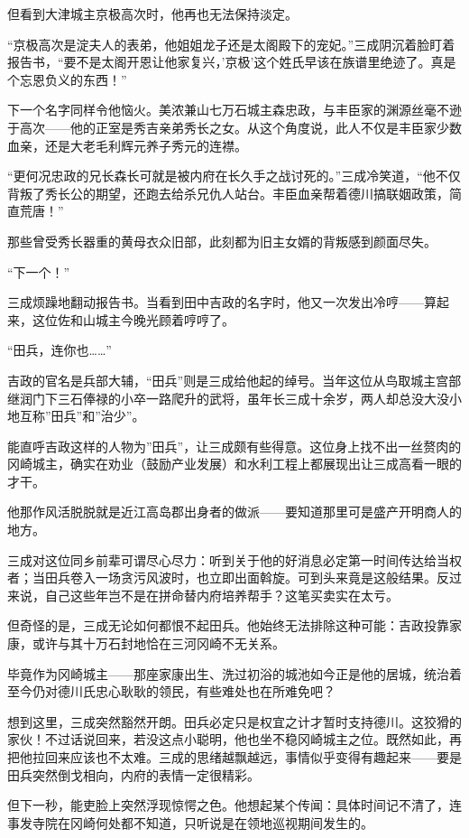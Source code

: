 \documentclass[
]{book}
\begin{document}
但看到大津城主京极高次时，他再也无法保持淡定。

``京极高次是淀夫人的表弟，他姐姐龙子还是太阁殿下的宠妃。''三成阴沉着脸盯着报告书，``要不是太阁开恩让他家复兴，'京极'这个姓氏早该在族谱里绝迹了。真是个忘恩负义的东西！''

下一个名字同样令他恼火。美浓兼山七万石城主森忠政，与丰臣家的渊源丝毫不逊于高次------他的正室是秀吉亲弟秀长之女。从这个角度说，此人不仅是丰臣家少数血亲，还是大老毛利辉元养子秀元的连襟。

``更何况忠政的兄长森长可就是被内府在长久手之战讨死的。''三成冷笑道，``他不仅背叛了秀长公的期望，还跑去给杀兄仇人站台。丰臣血亲帮着德川搞联姻政策，简直荒唐！''

那些曾受秀长器重的黄母衣众旧部，此刻都为旧主女婿的背叛感到颜面尽失。

``下一个！''

三成烦躁地翻动报告书。当看到田中吉政的名字时，他又一次发出冷哼------算起来，这位佐和山城主今晚光顾着哼哼了。

``田兵，连你也\ldots\ldots{}''

吉政的官名是兵部大辅，``田兵''则是三成给他起的绰号。当年这位从鸟取城主宫部继润门下三石俸禄的小卒一路爬升的武将，虽年长三成十余岁，两人却总没大没小地互称''田兵''和''治少''。

能直呼吉政这样的人物为''田兵''，让三成颇有些得意。这位身上找不出一丝赘肉的冈崎城主，确实在劝业（鼓励产业发展）和水利工程上都展现出让三成高看一眼的才干。

他那作风活脱脱就是近江高岛郡出身者的做派------要知道那里可是盛产开明商人的地方。

三成对这位同乡前辈可谓尽心尽力：听到关于他的好消息必定第一时间传达给当权者；当田兵卷入一场贪污风波时，也立即出面斡旋。可到头来竟是这般结果。反过来说，自己这些年岂不是在拼命替内府培养帮手？这笔买卖实在太亏。

但奇怪的是，三成无论如何都恨不起田兵。他始终无法排除这种可能：吉政投靠家康，或许与其十万石封地恰在三河冈崎不无关系。

毕竟作为冈崎城主------那座家康出生、洗过初浴的城池如今正是他的居城，统治着至今仍对德川氏忠心耿耿的领民，有些难处也在所难免吧？

想到这里，三成突然豁然开朗。田兵必定只是权宜之计才暂时支持德川。这狡猾的家伙！不过话说回来，若没这点小聪明，他也坐不稳冈崎城主之位。既然如此，再把他拉回来应该也不太难。三成的思绪越飘越远，事情似乎变得有趣起来------要是田兵突然倒戈相向，内府的表情一定很精彩。

但下一秒，能吏脸上突然浮现惊愕之色。他想起某个传闻：具体时间记不清了，连事发寺院在冈崎何处都不知道，只听说是在领地巡视期间发生的。
\end{document}
